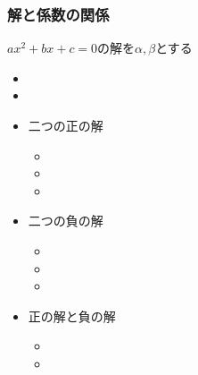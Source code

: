 \documentclass[10pt,dvipdfmx]{jsarticle}
\begin{document}
\subsubsection*{解と係数の関係}
$ax^2+bx+c=0$の解を$\alpha,\beta$とする
\begin{multicols}{2}
  \begin{itemize}
    \item \item
  \end{itemize}
\end{multicols}

\begin{multicols}{3}
  \begin{large}
    \begin{itemize}
      \item 二つの正の解
            \begin{itemize}
              \item \item \item
            \end{itemize}
      \item 二つの負の解
            \begin{itemize}
              \item \item \item
            \end{itemize}
      \item 正の解と負の解
            \begin{itemize}
              \item \item
            \end{itemize}
    \end{itemize}
  \end{large}
\end{multicols}


\newpage
\end{document}
